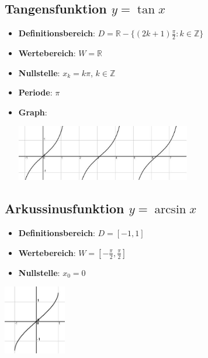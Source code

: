\subsection*{Tangensfunktion $y = \tan x$}
\begin{itemize}
	\item \textbf{Definitionsbereich}: $ D = \mathbb{R}-\{(2k+1)\frac{\pi}{2} : k \in \mathbb{Z}\} $
	\item \textbf{Wertebereich}: $ W = \mathbb{R} $
	\item \textbf{Nullstelle}: $x_k = k\pi $, $k \in \mathbb{Z}$
	\item \textbf{Periode}: $\pi$
	\item \textbf{Graph}: \\
\begin{center}
		\includegraphics[width=0.60\textwidth]{img/TanF.jpg}
\end{center}
\end{itemize}

\subsection*{Arkussinusfunktion $y = \arcsin x$}
\begin{minipage}{.5\textwidth}
\begin{itemize}
	\item \textbf{Definitionsbereich}: $ D = [-1, 1] $
	\item \textbf{Wertebereich}: $ W = [-\frac{\pi}{2}, \frac{\pi}{2}] $
	\item \textbf{Nullstelle}: $x_0 = 0$
\end{itemize}
\end{minipage}
\begin{minipage}{.5\textwidth}
		\includegraphics[height=3cm]{img/ASinF.jpg}
\end{minipage}


